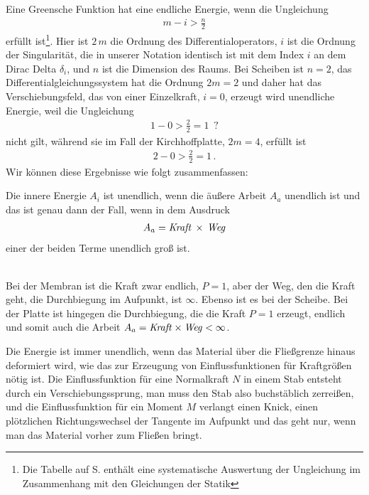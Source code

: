 {{{{{Eine Greensche Funktion hat eine endliche Energie, wenn die Ungleichung
\begin{align}\label{Eq23}
\boxed{m - i > \frac{n}{2}}
\end{align}
erf\"{u}llt ist\footnote{Die Tabelle auf S. \pageref{TabelleSobolev} enth\"{a}lt eine systematische Auswertung der Ungleichung im Zusammenhang mit den Gleichungen der Statik}. Hier ist $2\,m$ die Ordnung des Differentialoperators, $i$ ist die Ordnung der Singularit\"{a}t, die in unserer Notation identisch ist mit dem Index  $i$ an dem Dirac Delta $\delta_i$, und $n$ ist die Dimension des Raums. Bei Scheiben ist $n = 2$, das Differentialgleichungssystem hat die Ordnung $2 m = 2$ und daher hat das Verschiebungsfeld, das von einer Einzelkraft, $i = 0$, erzeugt wird unendliche Energie, weil die Ungleichung
\begin{align}
1 - 0 > \frac{2}{2} = 1\,\,\,?
\end{align}
nicht gilt, w\"{a}hrend sie im Fall der Kirchhoffplatte, $2m = 4$, erf\"{u}llt ist
\begin{align}
2 - 0 > \frac{2}{2} = 1\,.
\end{align}
Wir k\"{o}nnen diese Ergebnisse wie folgt zusammenfassen: \\

\hspace*{-12pt}\colorbox{highlightBlue}{\parbox{0.98\textwidth}{Die innere Energie $A_i$ ist unendlich, wenn die \"{a}u{\ss}ere Arbeit $A_a$ unendlich ist und das ist genau dann der Fall, wenn in dem Ausdruck
\begin{align}
A_a = \text{{\em Kraft\/}}\, \times\, \text{{\em Weg\/}}
\end{align}
einer der beiden Terme unendlich gro{\ss} ist.}}\\

Bei der Membran ist die Kraft zwar endlich, $P = 1$, aber der Weg, den die Kraft geht, die Durchbiegung im Aufpunkt, ist $\infty$. Ebenso ist es bei der Scheibe. Bei der Platte ist hingegen die Durchbiegung, die die Kraft $P = 1$ erzeugt, endlich und somit auch die Arbeit $A_a = \text{{\em Kraft\/}} \times \text{{\em Weg\/}} < \infty$.

Die Energie ist immer unendlich, wenn das Material \"{u}ber die Flie{\ss}grenze hinaus deformiert wird, wie das zur Erzeugung von Einflussfunktionen f\"{u}r Kraftgr\"{o}{\ss}en n\"{o}tig ist. Die Einflussfunktion f\"{u}r eine Normalkraft $N$ in einem Stab entsteht durch ein Verschiebungssprung, man muss den Stab also buchst\"{a}blich zerrei{\ss}en, und die Einflussfunktion f\"{u}r ein Moment $M$ verlangt einen Knick, einen pl\"{o}tzlichen Richtungswechsel der Tangente im Aufpunkt und das geht nur, wenn man das Material vorher zum Flie{\ss}en bringt.

}}}}}
